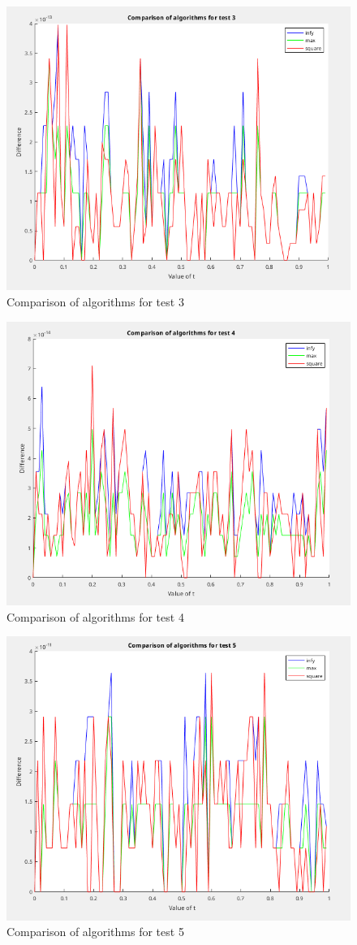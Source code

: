 \documentclass[]{article}
\begin{document}
\begin{figure}
  \centering
  \includegraphics[width=0.8\linewidth]{figs/test03.png}
  \caption{Comparison of algorithms for test 3}
  \label{fig:03}
\end{figure}

\begin{figure}
  \centering
  \includegraphics[width=0.8\linewidth]{figs/test04.png}
  \caption{Comparison of algorithms for test 4}
  \label{fig:04}
\end{figure}

\begin{figure}
  \centering
  \includegraphics[width=0.8\linewidth]{figs/test05.png}
  \caption{Comparison of algorithms for test 5}
  \label{fig:05}
\end{figure}
\end{document}
